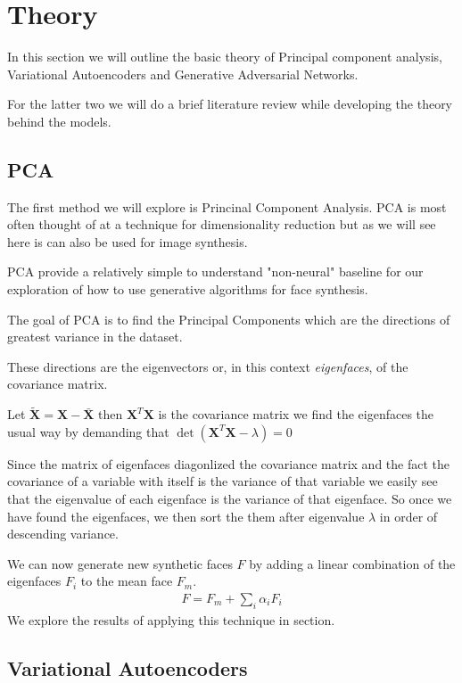 
\section{Theory}
In this section we will outline the basic theory of Principal component analysis, Variational Autoencoders and Generative Adversarial Networks.

For the latter two we will do a brief literature review while developing the theory behind the models.

\subsection{PCA}
The first method we will explore is Princinal Component Analysis. PCA is most often thought of at a technique for dimensionality reduction but as we will see here is can also be used for image synthesis.

PCA provide a relatively simple to understand "non-neural" baseline for our exploration of how to use  generative algorithms for face synthesis.

The goal of PCA is to find the Principal Components which are the directions of greatest variance in the dataset.

These directions are the eigenvectors or, in this context \emph{eigenfaces}, of the covariance matrix.

Let $\tilde{\mathbf{X}} = \mathbf{X} - \bar{\mathbf{X}}$ then $\mathbf{X}^T\mathbf{X}$ is the covariance matrix we find the eigenfaces the usual way by demanding that $\det(\mathbf{X}^T\mathbf{X} - \lambda) = 0$

Since the matrix of eigenfaces diagonlized the covariance matrix and the fact the covariance of a variable with itself is the variance of that variable we easily see that the eigenvalue of each eigenface is the variance of that eigenface. So once we have found the eigenfaces, we then sort the them after eigenvalue $\lambda$ in order of descending variance.

We can now generate new synthetic faces $F$ by adding a linear combination of the eigenfaces $F_i$ to the mean face $F_m$.
\begin{align}
F  = F_m + \sum_{i} \alpha_i F_i
\end{align}
We explore the results of applying this technique in section.



\subsection{Variational Autoencoders}


